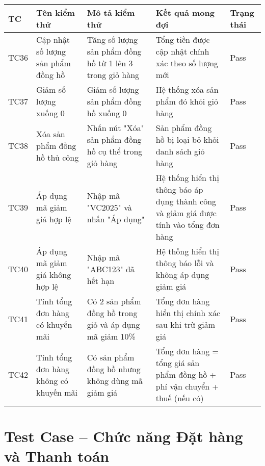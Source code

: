 \begin{longtable}{|p{1cm}|p{3cm}|p{4cm}|p{3cm}|p{2cm}|}
\hline
\textbf{TC} & \textbf{Tên kiểm thử} & \textbf{Mô tả kiểm thử} & \textbf{Kết quả mong đợi} & \textbf{Trạng thái} \\
\hline
TC36 & Cập nhật số lượng sản phẩm đồng hồ & Tăng số lượng sản phẩm đồng hồ từ 1 lên 3 trong giỏ hàng & Tổng tiền được cập nhật chính xác theo số lượng mới & Pass \\
\hline
TC37 & Giảm số lượng xuống 0 & Giảm số lượng sản phẩm đồng hồ xuống 0 & Hệ thống xóa sản phẩm đó khỏi giỏ hàng & Pass \\
\hline
TC38 & Xóa sản phẩm đồng hồ thủ công & Nhấn nút "Xóa" sản phẩm đồng hồ cụ thể trong giỏ hàng & Sản phẩm đồng hồ bị loại bỏ khỏi danh sách giỏ hàng & Pass \\
\hline
TC39 & Áp dụng mã giảm giá hợp lệ & Nhập mã "VC2025" và nhấn "Áp dụng" & Hệ thống hiển thị thông báo áp dụng thành công và giảm giá được tính vào tổng đơn hàng & Pass \\
\hline
TC40 & Áp dụng mã giảm giá không hợp lệ & Nhập mã "ABC123" đã hết hạn & Hệ thống hiển thị thông báo lỗi và không áp dụng giảm giá & Pass \\
\hline
TC41 & Tính tổng đơn hàng có khuyến mãi & Có 2 sản phẩm đồng hồ trong giỏ và áp dụng mã giảm 10\% & Tổng đơn hàng hiển thị chính xác sau khi trừ giảm giá & Pass \\
\hline
TC42 & Tính tổng đơn hàng không có khuyến mãi & Có sản phẩm đồng hồ nhưng không dùng mã giảm giá & Tổng đơn hàng = tổng giá sản phẩm đồng hồ + phí vận chuyển + thuế (nếu có) & Pass \\
\hline
\end{longtable}

\section*{Test Case – Chức năng Đặt hàng và Thanh toán}

